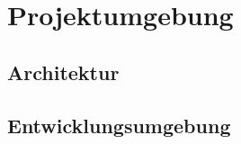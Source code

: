 \chapter{Projektumgebung} \label{projktum}


\section{Architektur} %



\section{Entwicklungsumgebung}
